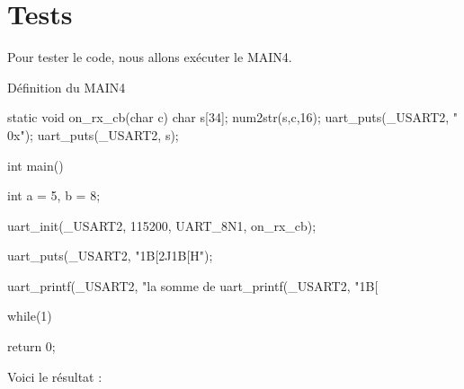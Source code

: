 \section{Tests}

Pour tester le code, nous allons exécuter le MAIN4.

\begin{Cpp}{Définition du MAIN4}

static void on_rx_cb(char c)
{
	char  s[34];
	num2str(s,c,16);
	uart_puts(_USART2, " 0x");
	uart_puts(_USART2, s);
}

int main()
{
	int a = 5, b = 8;

	uart_init(_USART2, 115200, UART_8N1, on_rx_cb);

	uart_puts(_USART2, "\x1B[2J\x1B[H");

	uart_printf(_USART2, "la somme de %
	uart_printf(_USART2, "\x1B[%

	while(1) {
	}

	return 0;
}
\end{Cpp}

Voici le résultat : 


